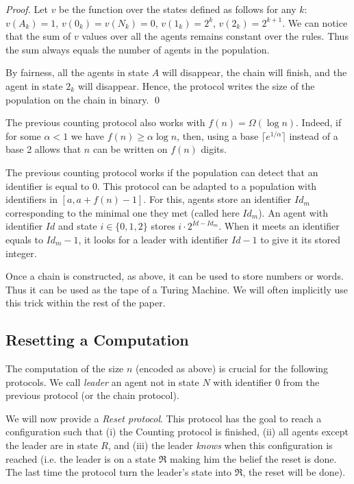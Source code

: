 \documentclass[UKenglish]{llncs}
\newcommand\RL{\mathfrak{R}}
\begin{document}
\begin{proof}
Let $v$ be the function over the states defined as follows for any $k$:
$v(A_k)=1$, $v(0_k)=v(N_k)=0$, $v(1_k)=2^k$, $v(2_k)=2^{k+1}$.  We
can notice that the sum of $v$ values over all the agents remains constant over the
rules. Thus the sum always equals the number of agents in the
population.

By fairness, all the agents in state $A$ will disappear, the chain will finish, and the agent in state $2_k$ will disappear.
Hence, the protocol writes the size of the population on the chain in binary. \hfill \qed
\end{proof}

\begin{remark}
The  previous counting protocol also works with $f(n)=\Omega(\log n)$.
Indeed, if for some $\alpha<1$ we have $f(n)\ge\alpha\log n$,
then, using a base $\lceil e^{1/\alpha}\rceil$ instead of a base 2 allows that $n$ can
be written on $f(n)$ digits.
\end{remark}

\begin{remark}   The  previous counting protocol  works if the population can detect that  an identifier is equal to $0$. 
This protocol can be adapted to a population 
with identifiers in $[a,a+f(n)-1]$. For this, agents store an identifier $Id_{m}$
corresponding to the minimal one they met (called here $Id_m$). An agent with identifier $Id$ and state $i\in\{0,1,2\}$
stores $i\cdot 2^{Id-Id_m}$. When it meets an identifier equals to $Id_m-1$,
it looks for a leader with identifier $Id-1$ to give it its stored integer.
\end{remark}


Once 
a chain is constructed, as above, it can be used to store numbers or
words. Thus it can be used as the tape of a Turing Machine. We will
often implicitly use this trick within the rest of the paper.  




\subsection{Resetting a Computation}

The computation of the size $n$ (encoded as above) is crucial for the following protocols.  
We call \emph{leader}  an agent not in state $N$ with identifier 0
from the previous protocol (or the chain protocol).


We will now provide a  \emph{Reset  protocol}. This protocol has the goal to reach a configuration
such that (i) the Counting protocol is finished, (ii) all agents except the leader are in state $R$, and (iii)
the leader {\it knows} when this configuration is reached (i.e. the leader is
on a state $\RL$ making him the belief the reset is done. The last time 
the protocol turn the leader's state into $\RL$, the reset will be done).
\end{document}
